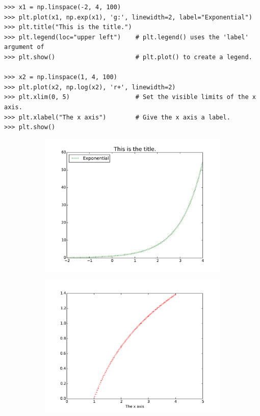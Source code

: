 \begin{lstlisting}
>>> x1 = np.linspace(-2, 4, 100)
>>> plt.plot(x1, np.exp(x1), 'g:', linewidth=2, label="Exponential")
>>> plt.title("This is the title.")
>>> plt.legend(loc="upper left")    # plt.legend() uses the 'label' argument of
>>> plt.show()                      # plt.plot() to create a legend.

>>> x2 = np.linspace(1, 4, 100)
>>> plt.plot(x2, np.log(x2), 'r+', linewidth=2)
>>> plt.xlim(0, 5)                  # Set the visible limits of the x axis.
>>> plt.xlabel("The x axis")        # Give the x axis a label.
>>> plt.show()
\end{lstlisting}

\begin{figure}[H] %
\captionsetup[subfigure]{justification=centering}
\centering
\begin{subfigure}{.5\textwidth}
    \centering
    \includegraphics[width=\linewidth]{custom1.pdf}
    \label{fig:custom1}
\end{subfigure}%
\begin{subfigure}{.5\textwidth}
    \centering
    \includegraphics[width=\linewidth]{custom2.pdf}
    \label{fig:custom2}
\end{subfigure}
\label{fig:custom}
\end{figure}

